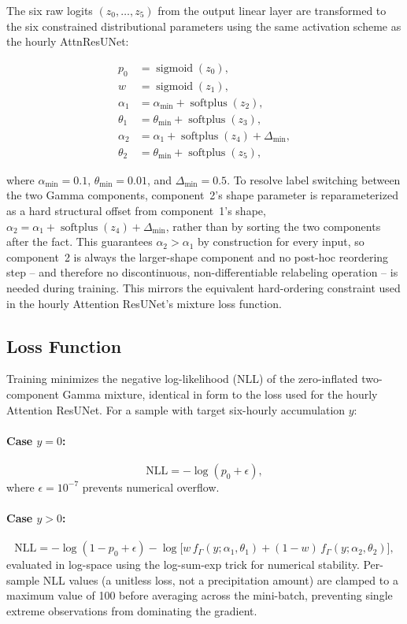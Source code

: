 \documentclass[11pt]{article}
\DeclareMathOperator{\softplus}{softplus}
\DeclareMathOperator{\sigmoid}{sigmoid}
\begin{document}
The six raw logits $(z_0,\ldots,z_5)$ from the output linear layer are
transformed to the six constrained distributional parameters using the same
activation scheme as the hourly AttnResUNet:
\begin{linenomath}
\begin{align}
  p_0 &= \sigmoid(z_0), \\
  w   &= \sigmoid(z_1), \\
  \alpha_1 &= \alpha_{\min} + \softplus(z_2), \\
  \theta_1 &= \theta_{\min} + \softplus(z_3), \\
  \alpha_2 &= \alpha_1 + \softplus(z_4) + \Delta_{\min}, \\
  \theta_2 &= \theta_{\min} + \softplus(z_5),
\end{align}
\end{linenomath}
where $\alpha_{\min} = 0.1$, $\theta_{\min} = 0.01$, and $\Delta_{\min} = 0.5$.
To resolve label switching between the two Gamma components, component~2's
shape parameter is reparameterized as a hard structural offset from
component~1's shape, $\alpha_2 = \alpha_1 + \softplus(z_4) + \Delta_{\min}$,
rather than by sorting the two components after the fact.  This guarantees
$\alpha_2 > \alpha_1$ by construction for every input, so component~2 is
always the larger-shape component and no post-hoc reordering step -- and
therefore no discontinuous, non-differentiable relabeling operation -- is
needed during training.  This mirrors the equivalent hard-ordering constraint
used in the hourly Attention ResUNet's mixture loss function.

\subsection{Loss Function}
\label{sec:loss}

Training minimizes the negative log-likelihood (NLL) of the zero-inflated
two-component Gamma mixture, identical in form to the loss used for the hourly
Attention ResUNet.  For a sample with target six-hourly accumulation $y$:

\paragraph{Case $y = 0$:}
\begin{equation}
  \text{NLL} = -\log(p_0 + \epsilon),
\end{equation}
where $\epsilon = 10^{-7}$ prevents numerical overflow.

\paragraph{Case $y > 0$:}
\begin{equation}
  \text{NLL} = -\log(1 - p_0 + \epsilon)
    - \log\!\bigl[
        w\, f_{\Gamma}(y;\alpha_1,\theta_1)
        + (1-w)\, f_{\Gamma}(y;\alpha_2,\theta_2)
      \bigr],
\end{equation}
evaluated in log-space using the log-sum-exp trick for numerical stability.
Per-sample NLL values (a unitless loss, not a precipitation amount) are
clamped to a maximum value of 100 before averaging across the mini-batch,
preventing single extreme observations from dominating the gradient.
\end{document}
